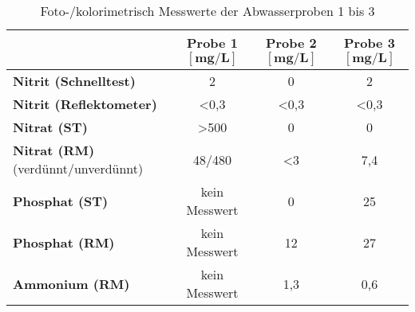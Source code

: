 \vspace*{-2.5mm}
\renewcommand{\arraystretch}{1.2}
\begin{table}[h!]
	\centering
	\caption{Foto-/kolorimetrisch Messwerte der Abwasserproben 1 bis 3}
	\label{tab:fotometrisch}
	\begin{tabulary}{1.2\textwidth}{L|C|C|C}
		\hline
		\textbf{} 						& \textbf{Probe 1} $\boldsymbol{\left[\si{\milli \gram \per \liter}\right]}$& \textbf{Probe 2}$\boldsymbol{\left[\si{\milli \gram \per \liter}\right]}$&\textbf{Probe 3}$\boldsymbol{\left[\si{\milli \gram \per \liter}\right]}$\\
		\hline
		\textbf{Nitrit  (Schnelltest)}	& 2	& 0&2\\
		\textbf{Nitrit  (Reflektometer)} & <0,3  & <0,3	&<0,3\\
		\hline
		\textbf{Nitrat  (ST)}			& >500 	& 0	&0\\
		\textbf{Nitrat  (RM)}	{\footnotesize (verdünnt/unverdünnt)}		& 48/480	& <3	&7,4\\
		\hline
		\textbf{Phosphat  (ST)}		& {\footnotesize kein Messwert}\protect\footnotemark[2]	& 0	&25\\
		\textbf{Phosphat  (RM)}		& {\footnotesize kein Messwert}\protect\footnotemark[2]	& 12	&27\\
		\hline
		\textbf{Ammonium  (RM)}		& {\footnotesize kein Messwert}\protect\footnotemark[2]		&	1,3	&0,6\\
		\hline
	\end{tabulary}
\end{table}
\FloatBarrier
\vspace*{-2.5mm}



